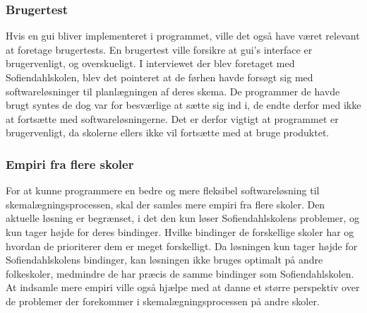 \subsubsection{Brugertest}
Hvis en gui bliver implementeret i programmet, ville det også have været relevant at foretage brugertests. En brugertest ville forsikre at gui’s interface er brugervenligt, og overskueligt. I interviewet der blev foretaget med Sofiendahlskolen, blev det pointeret at de førhen havde forsøgt sig med softwareløsninger til planlægningen af deres skema. De programmer de havde brugt syntes de dog var for besværlige at sætte sig ind i, de endte derfor med ikke at fortsætte med softwareløsningerne\cite{interview}. Det er derfor vigtigt at programmet er brugervenligt, da skolerne ellers ikke vil fortsætte med at bruge produktet. 
\subsubsection{Empiri fra flere skoler}
For at kunne programmere en bedre og mere fleksibel softwareløsning til skemalægningsprocessen, skal der samles mere empiri fra flere skoler. Den aktuelle løsning er begrænset, i det den kun løser Sofiendahlskolens problemer, og kun tager højde for deres bindinger. Hvilke bindinger de forskellige skoler har og hvordan de prioriterer dem er meget forskelligt. Da løsningen kun tager højde for Sofiendahlskolens bindinger, kan løsningen ikke bruges optimalt på andre folkeskoler, medmindre de har præcis de samme bindinger som Sofiendahlskolen. At indsamle mere empiri ville også hjælpe med at danne et større perspektiv over de problemer der forekommer i skemalægningsprocessen på andre skoler. 
